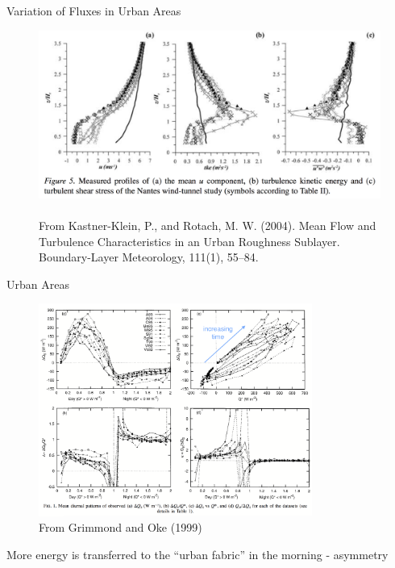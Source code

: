 
\begin{frame}{Variation of Fluxes in Urban Areas}

\begin{figure}
\includegraphics[width=\textwidth]{fig9}
\centering \tiny~\\From Kastner-Klein, P., and Rotach, M. W. (2004). Mean Flow and Turbulence Characteristics in an Urban Roughness Sublayer. Boundary-Layer Meteorology, 111(1), 55–84. 
\end{figure}
\end{frame}



\begin{frame}{Urban Areas}

\begin{figure}
\includegraphics[width=0.8\textwidth]{fig10}
\centering \tiny~\\From Grimmond and Oke (1999) 
\end{figure}
More energy is transferred to the ``urban fabric'' in the morning - asymmetry
\end{frame}

